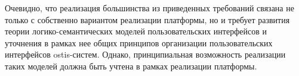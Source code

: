 Очевидно, что реализация большинства из приведенных требований связана не только с собственно вариантом реализации
платформы, но и требует развития теории логико-семантических моделей пользовательских интерфейсов и уточнения в
рамках нее общих принципов организации пользовательских интерфейсов ostis-систем. Однако, принципиальная возможность
реализации таких моделей должна быть учтена в рамках реализации платформы.

%